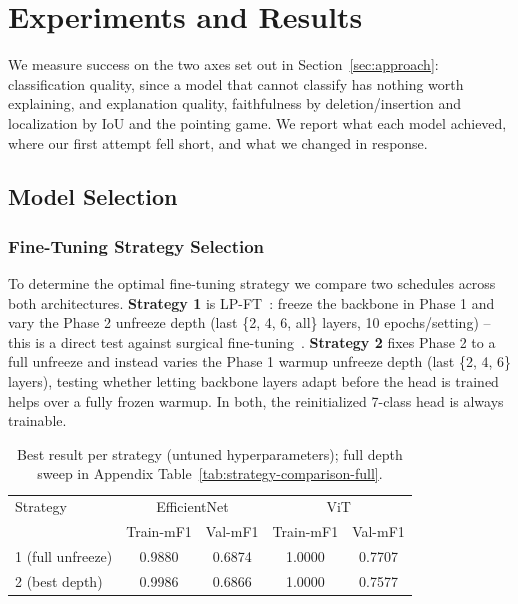 \documentclass[10pt,twocolumn,letterpaper]{article}
\begin{document}
\section{Experiments and Results}
\label{sec:results}

We measure success on the two axes set out in Section~\ref{sec:approach}:
classification quality, since a model that cannot classify has nothing worth
explaining, and explanation quality, faithfulness by deletion/insertion and
localization by IoU and the pointing game. We report what each model achieved,
where our first attempt fell short, and what we changed in response.

\subsection{Model Selection}
\label{sec:model-selection}

\subsubsection{Fine-Tuning Strategy Selection}
\label{sec:strategy}
To determine the optimal fine-tuning strategy we compare two schedules across
both architectures. \textbf{Strategy 1} is LP-FT~\cite{kumar2022finetuning}:
freeze the backbone in Phase 1 and vary the Phase 2 unfreeze depth (last
\{2, 4, 6, all\} layers, 10 epochs/setting) -- this is a direct test against
surgical fine-tuning~\cite{lee2023surgical}. \textbf{Strategy 2} fixes Phase 2
to a full unfreeze and instead varies the Phase 1 warmup unfreeze depth (last
\{2, 4, 6\} layers), testing whether letting backbone layers adapt before the
head is trained helps over a fully frozen warmup. In both, the reinitialized
7-class head is always trainable.

\begin{table}[t]
	\centering
	\footnotesize
	\setlength{\tabcolsep}{4pt}
	\begin{tabular}{lcccc}
		\toprule
		Strategy & \multicolumn{2}{c}{EfficientNet} & \multicolumn{2}{c}{ViT} \\
		 & Train-mF1 & Val-mF1 & Train-mF1 & Val-mF1 \\
		\midrule
		1 (full unfreeze) & 0.9880 & 0.6874 & 1.0000 & 0.7707 \\
		2 (best depth) & 0.9986 & 0.6866 & 1.0000 & 0.7577 \\
		\bottomrule
	\end{tabular}
	\caption{Best result per strategy (untuned hyperparameters); full depth
	sweep in Appendix Table~\ref{tab:strategy-comparison-full}.}
	\label{tab:strategy-comparison}
\end{table}
\end{document}
